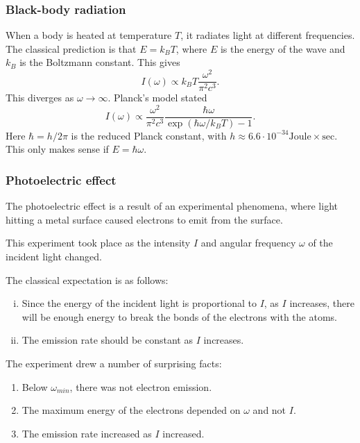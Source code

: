 \documentclass[12pt]{article}
\begin{document}
\subsubsection{Black-body radiation}%
\label{subsub:black_body_radiation}

When a body is heated at temperature $T$, it radiates light at different frequencies. The classical prediction is that $E = k_B T$, where $E$ is the energy of the wave and $k_B$ is the Boltzmann constant. This gives
\[
	I(\omega) \propto k_B T \frac{\omega^2}{\pi^2 c^3}
.\]
This diverges as $\omega \to \infty$. Planck's model stated
\[
	I(\omega) \propto \frac{\omega^2}{\pi^2 c^3} \frac{\hbar \omega}{\exp(\hbar \omega / k_B T) - 1}
.\]
Here $\hbar = h/2\pi$ is the reduced Planck constant, with $h \approx 6.6 \cdot 10^{-34} \text{Joule} \times \text{sec}$. This only makes sense if $E = \hbar \omega$.

\subsubsection{Photoelectric effect}%
\label{subsub:photoelectric_effect}

The photoelectric effect is a result of an experimental phenomena, where light hitting a metal surface caused electrons to emit from the surface.

This experiment took place as the intensity $I$ and angular frequency $\omega$ of the incident light changed.

The classical expectation is as follows:
\begin{enumerate}[(i)]
	\item Since the energy of the incident light is proportional to $I$, as $I$ increases, there will be enough energy to break the bonds of the electrons with the atoms.
	\item The emission rate should be constant as $I$ increases.
\end{enumerate}

The experiment drew a number of surprising facts:
\begin{enumerate}[1.]
	\item Below $\omega_{min}$, there was not electron emission.
	\item The maximum energy of the electrons depended on $\omega$ and not $I$.
	\item The emission rate increased as $I$ increased.
\end{enumerate}
\end{document}
